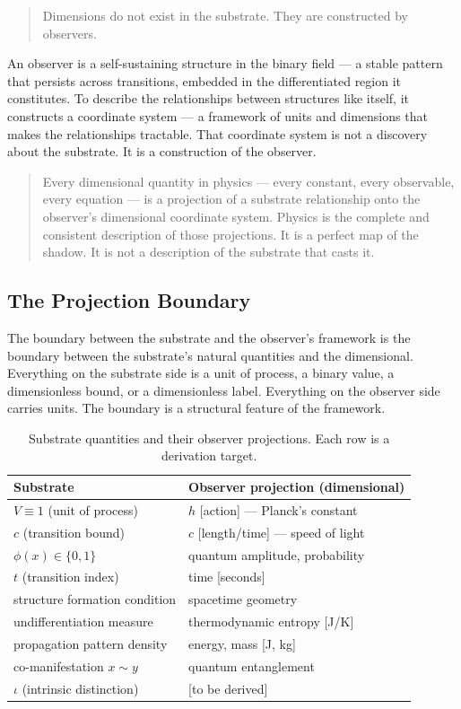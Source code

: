 \documentclass[11pt,letterpaper]{article}
\begin{document}
\begin{quote}
Dimensions do not exist in the substrate. They are constructed by observers.
\end{quote}

An observer is a self-sustaining structure in the binary field --- a stable pattern that persists across transitions, embedded in the differentiated region it constitutes. To describe the relationships between structures like itself, it constructs a coordinate system --- a framework of units and dimensions that makes the relationships tractable. That coordinate system is not a discovery about the substrate. It is a construction of the observer.

\begin{quote}
Every dimensional quantity in physics --- every constant, every observable, every equation --- is a projection of a substrate relationship onto the observer's dimensional coordinate system. Physics is the complete and consistent description of those projections. It is a perfect map of the shadow. It is not a description of the substrate that casts it.
\end{quote}
\subsection{The Projection Boundary}
\label{sec:org9027d51}

The boundary between the substrate and the observer's framework is the boundary between the substrate's natural quantities and the dimensional. Everything on the substrate side is a unit of process, a binary value, a dimensionless bound, or a dimensionless label. Everything on the observer side carries units. The boundary is a structural feature of the framework.

\begin{table}[htbp]
\caption{Substrate quantities and their observer projections. Each row is a derivation target.}
\centering
\begin{tabular}{lp{6cm}}
\toprule
\textbf{Substrate} & \textbf{Observer projection (dimensional)}\\
\midrule
\(V \equiv 1\) (unit of process) & \(h\) {[}action] --- Planck's constant\\
\(c\) (transition bound) & \(c\) {[}length/time] --- speed of light\\
\(\phi(x) \in \{0, 1\}\) & quantum amplitude, probability\\
\(t\) (transition index) & time [seconds]\\
structure formation condition & spacetime geometry\\
undifferentiation measure & thermodynamic entropy [J/K]\\
propagation pattern density & energy, mass [J, kg]\\
co-manifestation \(x \sim y\) & quantum entanglement\\
\(\iota\) (intrinsic distinction) & {[}to be derived]\\
\bottomrule
\end{tabular}
\end{table}
\end{document}

